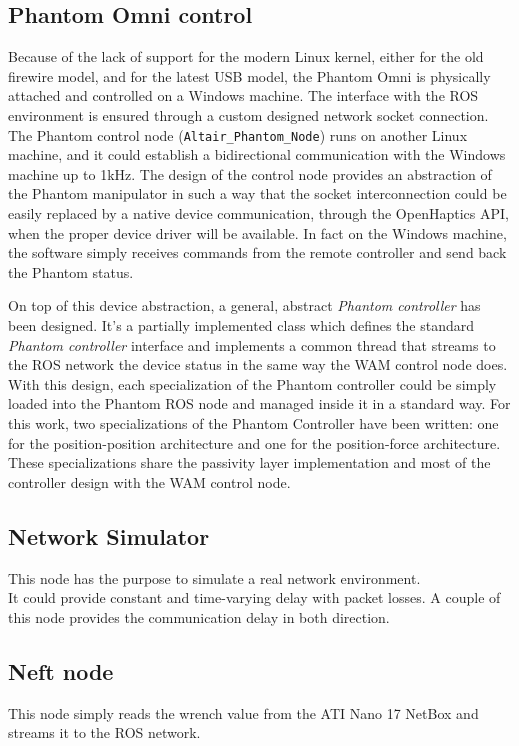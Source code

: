 \subsection{Phantom Omni control}
Because of the lack of support for the modern Linux kernel, either for the old firewire model, and for the latest USB model, the Phantom Omni is physically attached and controlled on a Windows machine.
The interface with the ROS environment is ensured through a custom designed network socket connection.\\
The Phantom control node (\texttt{Altair_Phantom_Node}) runs on another Linux machine, and it could establish a bidirectional communication with the Windows machine up to 1kHz.
The design of the control node provides an abstraction of the Phantom manipulator in such a way that the socket interconnection could be easily replaced by a native device communication, through the OpenHaptics API, when the proper device driver will be available.
In fact on the Windows machine, the software simply receives commands from the remote controller and send back the Phantom status.

On top of this device abstraction, a general, abstract \textit{Phantom controller} has been designed. It's a partially implemented class which defines the standard \textit{Phantom controller} interface and implements a common thread that streams to the ROS network the device status in the same way the WAM control node does.
With this design, each specialization of the Phantom controller could be simply loaded into the Phantom ROS node and managed inside it in a standard way.
For this work, two specializations of the Phantom Controller have been written: one for the position-position architecture and one for the position-force architecture.
These specializations share the passivity layer implementation and most of the controller design with the WAM control node. 

\subsection{Network Simulator}
This node has the purpose to simulate a real network environment.\\
It could provide constant and time-varying delay with packet losses.
A couple of this node provides the communication delay in both direction.

\subsection{Neft node}
This node simply reads the wrench value from the ATI Nano 17 NetBox and streams it to the ROS network.

